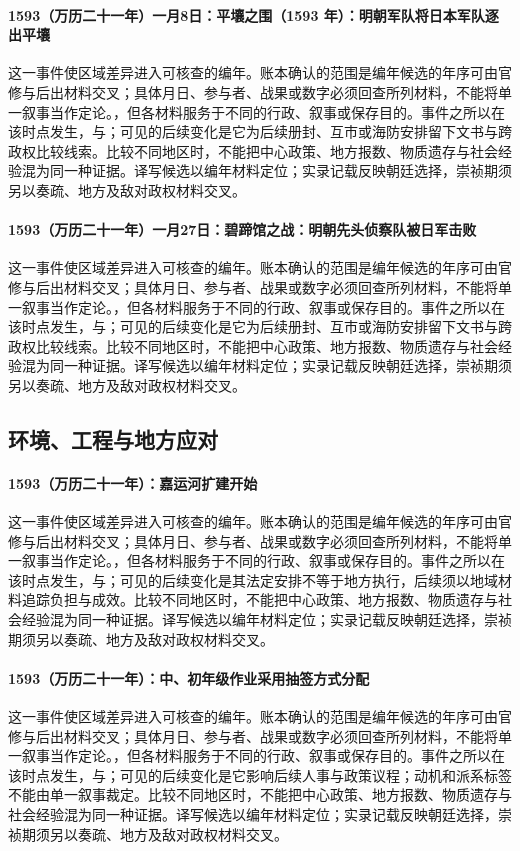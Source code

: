 \paragraph{1593（万历二十一年）一月8日：平壤之围（1593 年）：明朝军队将日本军队逐出平壤} 这一事件使区域差异进入可核查的编年。账本确认的范围是编年候选的年序可由官修与后出材料交叉；具体月日、参与者、战果或数字必须回查所列材料，不能将单一叙事当作定论。，但各材料服务于不同的行政、叙事或保存目的。事件之所以在该时点发生，与；可见的后续变化是它为后续册封、互市或海防安排留下文书与跨政权比较线索。比较不同地区时，不能把中心政策、地方报数、物质遗存与社会经验混为同一种证据。译写候选以编年材料定位；实录记载反映朝廷选择，崇祯期须另以奏疏、地方及敌对政权材料交叉。

\paragraph{1593（万历二十一年）一月27日：碧蹄馆之战：明朝先头侦察队被日军击败} 这一事件使区域差异进入可核查的编年。账本确认的范围是编年候选的年序可由官修与后出材料交叉；具体月日、参与者、战果或数字必须回查所列材料，不能将单一叙事当作定论。，但各材料服务于不同的行政、叙事或保存目的。事件之所以在该时点发生，与；可见的后续变化是它为后续册封、互市或海防安排留下文书与跨政权比较线索。比较不同地区时，不能把中心政策、地方报数、物质遗存与社会经验混为同一种证据。译写候选以编年材料定位；实录记载反映朝廷选择，崇祯期须另以奏疏、地方及敌对政权材料交叉。

\subsection{环境、工程与地方应对}

\paragraph{1593（万历二十一年）：嘉运河扩建开始} 这一事件使区域差异进入可核查的编年。账本确认的范围是编年候选的年序可由官修与后出材料交叉；具体月日、参与者、战果或数字必须回查所列材料，不能将单一叙事当作定论。，但各材料服务于不同的行政、叙事或保存目的。事件之所以在该时点发生，与；可见的后续变化是其法定安排不等于地方执行，后续须以地域材料追踪负担与成效。比较不同地区时，不能把中心政策、地方报数、物质遗存与社会经验混为同一种证据。译写候选以编年材料定位；实录记载反映朝廷选择，崇祯期须另以奏疏、地方及敌对政权材料交叉。

\paragraph{1593（万历二十一年）：中、初年级作业采用抽签方式分配} 这一事件使区域差异进入可核查的编年。账本确认的范围是编年候选的年序可由官修与后出材料交叉；具体月日、参与者、战果或数字必须回查所列材料，不能将单一叙事当作定论。，但各材料服务于不同的行政、叙事或保存目的。事件之所以在该时点发生，与；可见的后续变化是它影响后续人事与政策议程；动机和派系标签不能由单一叙事裁定。比较不同地区时，不能把中心政策、地方报数、物质遗存与社会经验混为同一种证据。译写候选以编年材料定位；实录记载反映朝廷选择，崇祯期须另以奏疏、地方及敌对政权材料交叉。

